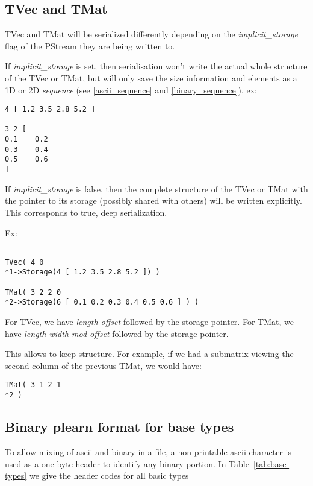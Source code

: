 \documentclass[11pt]{book}
\begin{document}
\subsection{TVec and TMat}

TVec and TMat will be serialized differently depending on the {\em
implicit_storage} flag of the PStream they are being written to.

If {\em implicit_storage} is set, then serialisation won't write the actual
whole structure of the TVec or TMat, but will only save the size information
and elements as a 1D or 2D {\em sequence} (see \ref{ascii_sequence} and
\ref{binary_sequence}), ex:

\begin{verbatim}
4 [ 1.2 3.5 2.8 5.2 ]

3 2 [
0.1    0.2
0.3    0.4
0.5    0.6
]
\end{verbatim}

If {\em implicit_storage} is false, then the complete structure of the
TVec or TMat with the pointer to its storage (possibly shared with others)
will be written explicitly. This corresponds to true, deep serialization.

Ex:

\begin{verbatim}

TVec( 4 0 
*1->Storage(4 [ 1.2 3.5 2.8 5.2 ]) )

TMat( 3 2 2 0 
*2->Storage(6 [ 0.1 0.2 0.3 0.4 0.5 0.6 ] ) )

\end{verbatim}

For TVec, we have {\em length offset} followed by the storage pointer.
For TMat, we have {\em length width mod offset} followed by the storage pointer.

This allows to keep structure. For example, if we had a submatrix viewing
the second column of the previous TMat, we would have:

\begin{verbatim}
TMat( 3 1 2 1
*2 )
\end{verbatim}

\subsection{Binary plearn format for base types}

To allow mixing of ascii and binary in a file, a non-printable ascii
character is used as a one-byte header to identify any binary portion.  In
Table~\ref{tab:base-types} we give the header codes for all basic types
\end{document}
